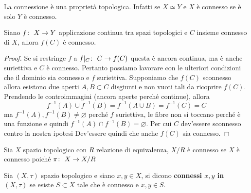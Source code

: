 \begin{remark}
	La connessione è una proprietà topologica. Infatti se $X \simeq Y$ e $X$ è connesso se è solo $Y$ è connesso. 
\end{remark} 

\begin{theorem}
	\label{thr:3.21.3}
	Siano $f \colon\ X \rightarrow Y$ applicazione continua tra spazi topologici e $C$ insieme connesso di $X$, allora $f(C)$ è connesso. 
\end{theorem} 
\begin{proof}
	Se si restringe $f$ a $f|_C \colon\ C \rightarrow f(C)$ questa è ancora continua, ma è anche suriettiva e $C$ è connesso. Pertanto possiamo lavorare con le ulteriori condizioni che il dominio sia connesso e $f$ suriettiva. Supponiamo che $f(C)$ sconnesso allora esistono due aperti $A, B \subset C$ disgiunti e non vuoti tali da ricoprire $f(C)$. Prendendo le controimmagini (ancora aperte perché continue), allora 
	\begin{equation*}
		f^{-1}(A) \cup f^{-1}(B) = f^{-1}(A \cup B) = f^{-1}(C) = C
	\end{equation*}
	ma $f^{-1}(A), f^{-1}(B) \neq \varnothing$ perché $f$ suriettiva, le fibre non si toccano perché è una funzione e quindi $f^{-1}(A) \cap f^{-1}(B) = \varnothing$. Per cui $C$ dev'essere sconnesso contro la nostra ipotesi Dev'essere quindi che anche $f(C)$ sia connesso.
\end{proof}

\begin{remark}
	Sia $X$ spazio topologico con $R$ relazione di equivalenza, $X/R$ è connesso se $X$ è connesso poiché $\pi \colon\ X \rightarrow X/R$
\end{remark} 

\begin{definition}
	Sia $(X, \tau)$ spazio topologico e siano $x, y \in X$, si dicono \textbf{connessi $x, y$ in $(X, \tau)$} se esiste $S \subset X$ tale che è connesso e $x, y\in S$.
\end{definition} 

